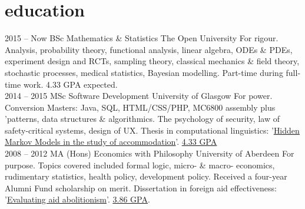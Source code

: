 \documentclass[]{friggeri-cv}
\newcommand{\altHmms}{\underline{\href{https://www.gleech.org/accommodation}{Hidden Markov Models in the study of accommodation}}}%
\newcommand{\altAid}{\underline{\href{https://www.gleech.org/aid}{Evaluating aid abolitionism}}}%
\newcommand{\sparkCert}{\underline{\href{http://www.oreilly.com/data/sparkcert.html}{O'Reilly Developer Certification for Spark}}}%
\newcommand{\scala}{\underline{\href{https://www.coursera.org/specializations/scala}{Odersky`s Scala Specialisation}}}%
\newcommand{\aberdeenGpa}{\underline{\href{https://gist.github.com/g-leech/1caae639bdc20bc62497fb1ca2bcf086}{3.86 GPA}}}%
\newcommand{\glasgowGpa}{\underline{\href{https://gist.github.com/g-leech/5094d1a47d162a17c134f002375999b9}{4.33 GPA}}}%
\begin{document}
\section{education}
\begin{entrylist}
  \entry
    {2015 – Now}
    {BSc Mathematics \& Statistics}
    {The Open University}
    {For rigour. Analysis, probability theory, functional analysis, linear algebra, ODEs \& PDEs, experiment design and RCTs, sampling theory, classical mechanics \& field theory, stochastic processes, medical statistics, Bayesian modelling. Part-time during full-time work. 4.33 GPA expected.}\smallskip \\
    
  \entry
    {2014 – 2015}
    {MSc Software Development}
    {University of Glasgow}
    {For power. Conversion Masters: Java, SQL, HTML/CSS/PHP, MC6800 assembly plus 'patterns, data structures \& algorithmics. The psychology of security, law of safety-critical systems, design of UX. Thesis in computational linguistics: '\altHmms{}'. \glasgowGpa{}} \smallskip\\
  \entry
    {2008 – 2012}
    {MA (Hons) Economics with Philosophy} 
    {University of Aberdeen}
    {For purpose. Topics covered included formal logic, micro- \& macro- economics, rudimentary
statistics, health policy, development policy. Received a four-year Alumni Fund scholarship on merit. Dissertation in foreign aid effectiveness: '\altAid{}'. \aberdeenGpa{}. }
\end{entrylist}
\end{document}
